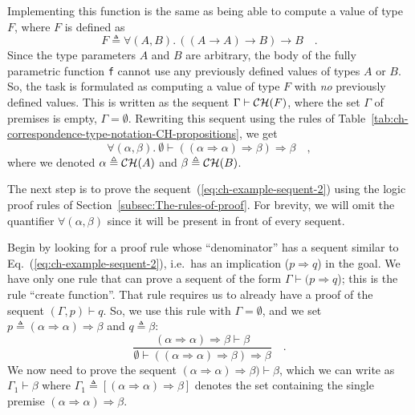\noindent Implementing this function is the same as being able to
compute a value of type $F$, where $F$ is defined as
\[
F\triangleq\forall(A,B).\,((A\rightarrow A)\rightarrow B)\rightarrow B\quad.
\]
Since the type parameters $A$ and $B$ are arbitrary, the body of
the fully parametric function \lstinline!f! cannot use any previously
defined values of types $A$ or $B$. So, the task is formulated as
computing a value of type $F$ with \emph{no} previously defined values.
This is written as the sequent $\Gamma\vdash{\cal CH}(F)$, where
the set $\Gamma$ of premises is empty, $\Gamma=\emptyset$. Rewriting
this sequent using the rules of Table~\ref{tab:ch-correspondence-type-notation-CH-propositions},
we get
\begin{equation}
\forall(\alpha,\beta).~\emptyset\vdash((\alpha\Rightarrow\alpha)\Rightarrow\beta)\Rightarrow\beta\quad,\label{eq:ch-example-sequent-2}
\end{equation}
where we denoted $\alpha\triangleq{\cal CH}(A)$ and $\beta\triangleq{\cal CH}(B)$. 

The next step is to prove the sequent~(\ref{eq:ch-example-sequent-2})
using the logic proof rules of Section~\ref{subsec:The-rules-of-proof}.
For brevity, we will omit the quantifier $\forall(\alpha,\beta)$
since it will be present in front of every sequent.

Begin by looking for a proof rule whose \textsf{``}denominator\textsf{''} has a sequent
similar to Eq.~(\ref{eq:ch-example-sequent-2}), i.e.~has an implication
($p\Rightarrow q$) in the goal. We have only one rule that can prove
a sequent of the form $\Gamma\vdash(p\Rightarrow q$); this is the
rule \textsf{``}$\text{create function}$\textsf{''}. That rule requires us to already
have a proof of the sequent $(\Gamma,p)\vdash q$. So, we use this
rule with $\Gamma=\emptyset$, and we set $p\triangleq(\alpha\Rightarrow\alpha)\Rightarrow\beta$
and $q\triangleq\beta$: 
\[
\frac{(\alpha\Rightarrow\alpha)\Rightarrow\beta\vdash\beta}{\emptyset\vdash((\alpha\Rightarrow\alpha)\Rightarrow\beta)\Rightarrow\beta}\quad.
\]
We now need to prove the sequent $(\alpha\Rightarrow\alpha)\Rightarrow\beta)\vdash\beta$,
which we can write as $\Gamma_{1}\vdash\beta$ where $\Gamma_{1}\triangleq[(\alpha\Rightarrow\alpha)\Rightarrow\beta]$
denotes the set containing the single premise $(\alpha\Rightarrow\alpha)\Rightarrow\beta$. 

